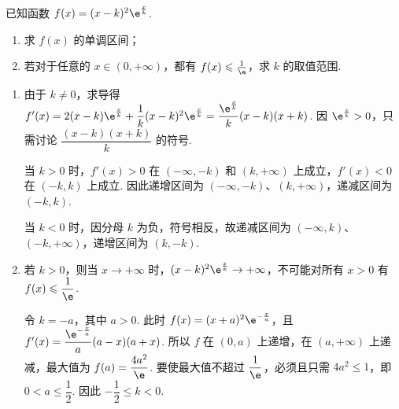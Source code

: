 \begin{problem}
已知函数 \(f(x) = (x - k)^2\e^{\frac{x}{k}}\).

\begin{enumerate}
\item 求 \(f(x)\) 的单调区间；
\item 若对于任意的 \(x \in (0, +\infty)\)，都有 \(f(x) \leqslant \frac{1}{\e}\)，求 \(k\) 的取值范围.
\end{enumerate}

\begin{solution}
\begin{enumerate}
\item 由于 \(k\ne0\)，求导得 \(f'(x)=2(x-k)\e^{\frac{x}{k}}+\dfrac1k(x-k)^2\e^{\frac{x}{k}}=\dfrac{\e^{\frac{x}{k}}}{k}(x-k)(x+k)\). 因 \(\e^{\frac{x}{k}}>0\)，只需讨论 \(\dfrac{(x-k)(x+k)}k\) 的符号.

当 \(k>0\) 时，\(f'(x)>0\) 在 \((-\infty,-k)\) 和 \((k,+\infty)\) 上成立，\(f'(x)<0\) 在 \((-k,k)\) 上成立. 因此递增区间为 \((-\infty,-k)\)、\((k,+\infty)\)，递减区间为 \((-k,k)\).

当 \(k<0\) 时，因分母 \(k\) 为负，符号相反，故递减区间为 \((-\infty,k)\)、\((-k,+\infty)\)，递增区间为 \((k,-k)\).
\item 若 \(k>0\)，则当 \(x\to+\infty\) 时，\((x-k)^2\e^{\frac{x}{k}}\to+\infty\)，不可能对所有 \(x>0\) 有 \(f(x)\leqslant\dfrac1\e\).

令 \(k=-a\)，其中 \(a>0\). 此时 \(f(x)=(x+a)^2\e^{-\frac{x}{a}}\)，且 \(f'(x)=\dfrac{\e^{-\frac{x}{a}}}a(a-x)(a+x)\). 所以 \(f\) 在 \((0,a)\) 上递增，在 \((a,+\infty)\) 上递减，最大值为 \(f(a)=\dfrac{4a^2}{\e}\). 要使最大值不超过 \(\dfrac1\e\)，必须且只需 \(4a^2\leqslant1\)，即 \(0<a\leqslant\dfrac12\). 因此 \(-\dfrac12\leqslant k<0\).
\end{enumerate}
\end{solution}
\end{problem}

